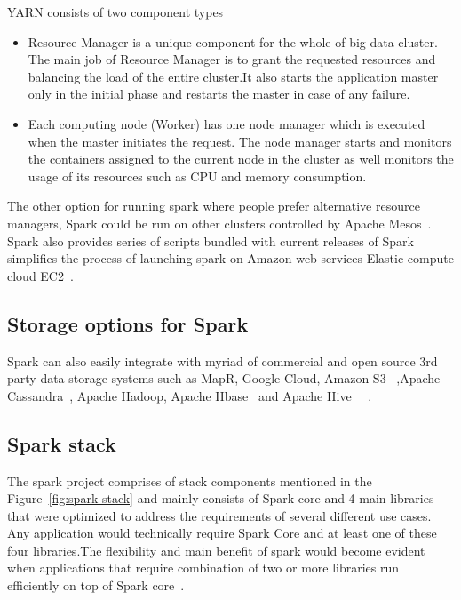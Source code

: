 YARN consists of two component types

\begin{itemize}

\item Resource Manager is a unique component for the whole of big data cluster. 
The main job of Resource Manager is to grant the requested resources and 
balancing the load of the entire cluster.It also starts the application master 
only in the initial phase and restarts the master in case of any failure.

\item Each computing node (Worker) has one node manager  which is executed when 
the master initiates the request. The node manager starts and monitors the 
containers assigned to the current node in the cluster as well monitors the 
usage of its resources such as CPU and memory consumption.

\end{itemize}

The other option for running spark where people prefer alternative resource 
managers, Spark could be run on other clusters 
controlled by Apache Mesos~\cite{hid-sp18-410-mesos}.
Spark also provides series of scripts bundled with current releases of Spark 
simplifies the process of launching spark on Amazon web services Elastic 
compute cloud EC2~\cite{hid-sp18-410-spark-architecture}.

\subsection{Storage options for Spark}

Spark can also easily integrate with myriad of commercial and open source 3rd 
party data storage systems such as MapR, 
Google Cloud, Amazon S3~\cite{hid-sp18-410-s3}
,Apache Cassandra~\cite{hid-sp18-408-cassandra}, Apache Hadoop, 
Apache Hbase~\cite{hid-sp18-406-hbase} and 
Apache Hive~\cite{hid-sp18-410-hive}
~\cite{hid-sp18-410-spark-architecture}.


\subsection{Spark stack}


The spark project comprises of stack components mentioned in the 
Figure~\ref{fig:spark-stack} and mainly consists of Spark core and 
4 main libraries that were optimized to address the requirements 
of several different use cases.
Any application would technically require Spark Core and at least one of these 
four libraries.The flexibility and main benefit of spark would become evident 
when applications that require combination of two or more libraries run 
efficiently on top of Spark core~\cite{hid-sp18-410-spark-architecture}.


